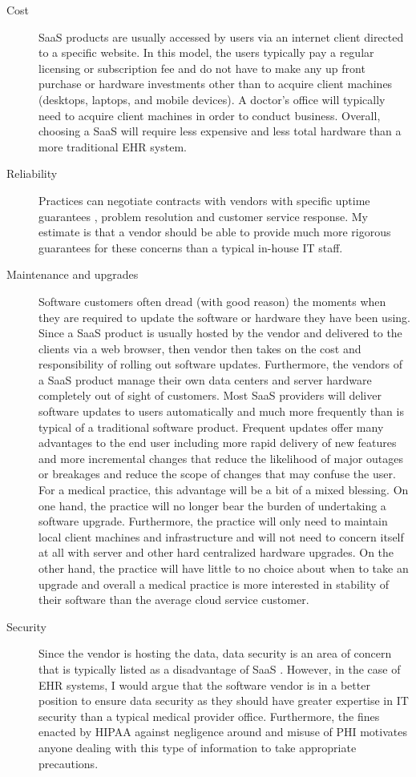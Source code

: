 \documentclass[10pt]{article}
\begin{document}
\begin{description}
\item[Cost]
SaaS products are usually accessed by users via an internet client directed to a specific website.
In this model, the users typically pay a regular licensing or subscription fee and do not have to make any up front purchase or hardware investments other than to acquire client machines (desktops, laptops, and mobile devices). 
A doctor's office will typically need to acquire client machines in order to conduct business. Overall, choosing a SaaS will require less expensive and less total hardware than a more traditional EHR system.

\item[Reliability]
Practices can negotiate contracts with vendors with specific uptime guarantees \cite{wiki-saas}, problem resolution and customer service response.
My estimate is that a vendor should be able to provide much more rigorous guarantees for these concerns than a typical in-house IT staff.

\item[Maintenance and upgrades]
Software customers often dread (with good reason) the moments when they are required to update the software or hardware they have been using.
Since a SaaS product is usually hosted by the vendor and delivered to the clients via a web browser, then vendor then takes on the cost and responsibility of rolling out software updates.
Furthermore, the vendors of a SaaS product manage their own data centers and server hardware completely out of sight of customers.
Most SaaS providers will deliver software updates to users automatically and much more frequently than is typical of a traditional software product.
Frequent updates offer many advantages to the end user including more rapid delivery of new features and more incremental changes that reduce the likelihood of major outages or breakages and reduce the scope of changes that may confuse the user.
For a medical practice, this advantage will be a bit of a mixed blessing.
On one hand, the practice will no longer bear the burden of undertaking a software upgrade.
Furthermore, the practice will only need to maintain local client machines and infrastructure and will not need to concern itself at all with server and other hard centralized hardware upgrades.
On the other hand, the practice will have little to no choice about when to take an upgrade and overall a medical practice is more interested in stability of their software than the average cloud service customer.

\item[Security]
Since the vendor is hosting the data, data security is an area of concern that is typically listed as a disadvantage of SaaS \cite{wiki-saas}.
However, in the case of EHR systems, I would argue that the software vendor is in a better position to ensure data security as they should have greater expertise in IT security than a typical medical provider office.
Furthermore, the fines enacted by HIPAA against negligence around and misuse of PHI motivates anyone dealing with this type of information to take appropriate precautions.

\end{description}
\end{document}
